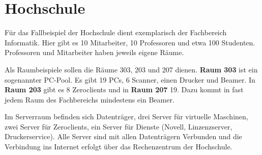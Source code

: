 \section{Hochschule}
Für das Fallbeispiel der Hochschule dient exemplarisch der Fachbereich Informatik. Hier gibt es 10 Mitarbeiter, 10 Professoren und etwa 100 Studenten. Professoren und Mitarbeiter haben jeweils eigene Räume.

Als Raumbeispiele sollen die Räume 303, 203 und 207 dienen.
\textbf{Raum 303} ist ein sogenannter PC-Pool. Es gibt 19 PCs, 6 Scanner, einen Drucker und Beamer. 
In \textbf{Raum 203} gibt es 8 Zeroclients und in \textbf{Raum 207} 19. Dazu kommt in fast jedem Raum des Fachbereichs mindestens ein Beamer.

Im Serverraum befinden sich Datenträger, drei Server für virtuelle Maschinen, zwei Server für Zeroclients, ein Server für Dienste (Novell, Linzenzserver, Druckerservice).
Alle Server sind mit allen Datenträgern Verbunden und die Verbindung ins Internet erfolgt über das Rechenzentrum der Hochschule.